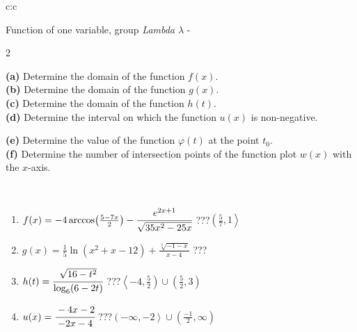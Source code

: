 \documentclass[10pt]{report}
\begin{document}
\begin{tabular}{c:c}
\begin{minipage}[c][104.5mm][t]{0.5\linewidth}
\begin{center}
\vspace{7mm}
{\huge Function of one variable, group \textit{Lambda $\lambda$} -}\\[5mm]
\begin{minipage}{0.95\linewidth}
\begin{center}
{\small \begin{multicols}{2} \raggedright
\textbf{(a)} Determine the domain of the function \(f(x)\). \\[1mm]
\textbf{(b)} Determine the domain of the function \(g(x)\). \\[1mm]
\textbf{(c)} Determine the domain of the function \(h(t)\). \\[1mm]
\textbf{(d)} Determine the interval on which the function \(u(x)\) is non-negative. \par \columnbreak
\textbf{(e)} Determine the value of the function \(\varphi(t)\) at the point \(t_0\). \\[1mm]
\textbf{(f)} Determine the number of intersection points of the function plot \(w(x)\) with the \(x\)-axis. \\[1mm]
\end{multicols}
}
\end{center}
\end{minipage}
\\[4mm]
\begin{minipage}{0.79\linewidth}
\begin{center}
\begin{varwidth}{\linewidth}
\begin{enumerate}
\small
\item $f(x) = -4\arccos\!\left( \frac{5-7x}{2} \right) - \cfrac{e^{2x+1}}{\sqrt{35x^2-25x}}$\quad \dotfill\; ???\;\dotfill \quad $\left(\frac{5}{7} , 1\right\rangle$
\item $g(x) = \frac{1}{5} \ln{\!(x^2+x-12)}+\frac{\sqrt[3]{-1-x}}{x-4}$\quad \dotfill\; ???\;\dotfill {}
\item $h(t) = \cfrac{\sqrt{16-t^2}}{\log_6(6-2t)}$\quad \dotfill\; ???\;\dotfill \quad $\left\langle-4 , \frac{5}{2}\right)\cup\left(\frac{5}{2} , 3\right)$
\item $u(x) = \cfrac{-4x-2}{-2x-4}$\quad \dotfill\; ???\;\dotfill \quad $\left(-\infty , -2\right\rangle\cup\left(\frac{-1}{2} , \infty\right)$

\end{enumerate}
\end{varwidth}
\end{center}
\end{minipage}
\end{center}
\end{minipage}
\end{tabular}
\end{document}
